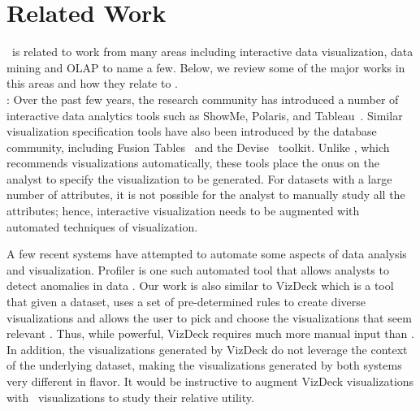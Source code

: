 

\section{Related Work}
\label{sec:related_work}

\VizRecDB\ is related to work from many areas including interactive data
visualization, data mining and OLAP to name a few. 
Below, we review some of the major works in this areas and how they relate to
\VizRecDB. \\

:
Over the past few years, the research community has introduced a number of
interactive data analytics tools such as ShowMe, Polaris, and 
Tableau~\cite{DBLP:journals/cacm/StolteTH08, DBLP:journals/tvcg/MackinlayHS07}.
Similar visualization specification tools have also been introduced by the
database community, including Fusion
Tables~\cite{DBLP:conf/sigmod/GonzalezHJLMSSG10} and the
Devise~\cite{DBLP:conf/sigmod/LivnyRBCDLMW97} toolkit. 
Unlike \VizRecDB, which recommends visualizations automatically, these tools place
the onus on the analyst to specify the visualization to be generated.
For datasets with a large number of attributes, it is not possible
for the analyst to manually study all the attributes; hence, interactive
visualization needs to be augmented with automated techniques of visualization.

A few recent systems have attempted to automate some aspects of data analysis
and visualization. Profiler is one such automated tool that allows analysts to
detect anomalies in data \cite{DBLP:conf/AVI/KandelPPHH12}.
Our work is also similar to VizDeck which is a tool that given a dataset, uses a
set of pre-determined rules to create diverse visualizations and
allows the user to pick and choose the visualizations that seem relevant
\cite{DBLP:conf/sigmod/KeyHPA12}.
Thus, while powerful, VizDeck requires much more manual input than \VizRecDB. 
In addition, the visualizations generated by VizDeck do not leverage the
context of the underlying dataset, making the visualizations generated by
both systems very different in flavor. 
It would be instructive to augment
VizDeck visualizations with \VizRecDB\ visualizations to study their relative
utility. \\


